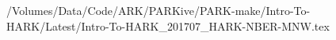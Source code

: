 /Volumes/Data/Code/ARK/PARKive/PARK-make/Intro-To-HARK/Latest/Intro-To-HARK_201707_HARK-NBER-MNW.tex